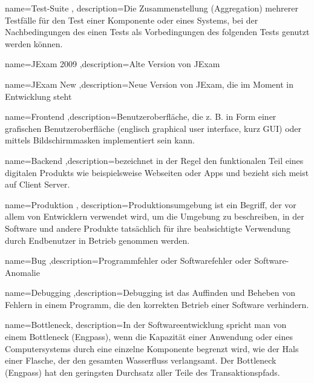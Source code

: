 {name=Test-Suite , description={Die Zusammenstellung (Aggregation) mehrerer Testf\"alle f\"ur den Test einer Komponente oder eines Systems, bei der Nachbedingungen des einen Tests als Vorbedingungen des folgenden Tests genutzt werden k\"onnen.}}

{name=JExam 2009 ,description={Alte Version von JExam}}

{name=JExam New ,description={Neue Version von JExam, die im Moment in Entwicklung steht}}

{name=Frontend ,description={Benutzeroberfläche, die z. B. in Form einer grafischen Benutzeroberfläche (englisch graphical user interface, kurz GUI) oder mittels Bildschirmmasken implementiert sein kann.}}

{name=Backend ,description={bezeichnet in der Regel den funktionalen Teil eines digitalen Produkts wie beispielsweise Webseiten oder Apps und bezieht sich meist auf Client Server.}}

{name=Produktion , description={Produktionsumgebung ist ein Begriff, der vor allem von Entwicklern verwendet wird, um die Umgebung zu beschreiben, in der Software und andere Produkte tatsächlich für ihre beabsichtigte Verwendung durch Endbenutzer in Betrieb genommen werden.}}

{name=Bug ,description={Programmfehler oder Softwarefehler oder Software-Anomalie}}

{name=Debugging ,description={Debugging ist das Auffinden und Beheben von Fehlern in einem Programm, die den korrekten Betrieb einer Software verhindern.}}

{name=Bottleneck, description={In der Softwareentwicklung spricht man von einem Bottleneck (Engpass), wenn die Kapazität einer Anwendung oder eines Computersystems durch eine einzelne Komponente begrenzt wird, wie der Hals einer Flasche, der den gesamten Wasserfluss verlangsamt. Der Bottleneck (Engpass) hat den geringsten Durchsatz aller Teile des Transaktionspfads.}}